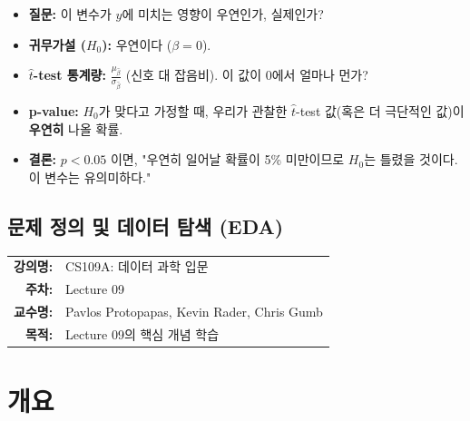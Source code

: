 \documentclass[11pt,a4paper]{book}
\makeatletter
\theoremstyle{definition}
\newcommand{\metainfo}[4]{
\begin{tcolorbox}[
    colback=lightpurple,
    colframe=darkpurple,
    boxrule=1pt,
    arc=2mm,
    left=10pt,
    right=10pt,
    top=8pt,
    bottom=8pt
]
\begin{tabular}{@{}rl@{}}
\textbf{강의명:} & #1 \\[0.3em]
\textbf{주차:} & #2 \\[0.3em]
\textbf{교수명:} & #3 \\[0.3em]
\textbf{목적:} & \begin{minipage}[t]{0.75\textwidth}#4\end{minipage}
\end{tabular}
\end{tcolorbox}
}
\makeatother
\begin{document}
\begin{tcolorbox}[
  colback=yellow!5!white,
  colframe=yellow!75!black,
  title=3. $\hat{t}$-test 와 p-value (유의성 검증),
  fonttitle=\bfseries
]
\begin{itemize}
    \item \textbf{질문:} 이 변수가 $y$에 미치는 영향이 우연인가, 실제인가?
    \item \textbf{귀무가설 ($H_0$):} 우연이다 ($\beta = 0$).
    \item \textbf{$\hat{t}$-test 통계량:} $\frac{\mu_{\hat{\beta}}}{\sigma_{\hat{\beta}}}$ (신호 대 잡음비). 이 값이 0에서 얼마나 먼가?
    \item \textbf{p-value:} $H_0$가 맞다고 가정할 때, 우리가 관찰한 $\hat{t}$-test 값(혹은 더 극단적인 값)이 \textbf{우연히} 나올 확률.
    \item \textbf{결론:} $p < 0.05$ 이면, "우연히 일어날 확률이 5\% 미만이므로 $H_0$는 틀렸을 것이다. 이 변수는 유의미하다."
\end{itemize}
\end{tcolorbox}


\chapter{문제 정의 및 데이터 탐색 (EDA)}
\label{ch:lecture9}

\metainfo{CS109A: 데이터 과학 입문}{Lecture 09}{Pavlos Protopapas, Kevin Rader, Chris Gumb}{Lecture 09의 핵심 개념 학습}


\part{개요}
\end{document}

